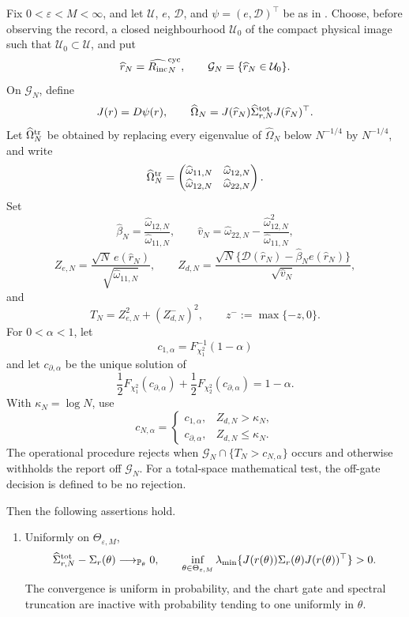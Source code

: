 \begin{theorem}
\label{thm:uniform-joint-physical-image-test-main}
Fix \(0<\varepsilon<M<\infty\), and let \(\mathcal U\), \(e\),
\(\mathcal D\), and \(\psi=(e,\mathcal D)^\top\) be as in
.  Choose, before observing the
record, a closed neighbourhood \(\mathcal U_0\) of the compact physical
image such that \(\mathcal U_0\subset\mathcal U\), and put
\[
\widehat r_N=\widehat{R_{\mathrm{inc}}}_N^{\rm cyc},
\qquad
\mathcal G_N=\{\widehat r_N\in\mathcal U_0\}.
\]
On \(\mathcal G_N\), define
\[
J(r)=D\psi(r),\qquad
\widehat\Omega_N
=J(\widehat r_N)\widehat\Sigma_{r,N}^{\rm tot}
J(\widehat r_N)^\top .
\]
Let \(\widehat\Omega_N^{\rm tr}\) be obtained by replacing every eigenvalue
of \(\widehat\Omega_N\) below \(N^{-1/4}\) by \(N^{-1/4}\), and write
\[
\widehat\Omega_N^{\rm tr}
=\begin{pmatrix}
\widehat\omega_{11,N}&\widehat\omega_{12,N}\\
\widehat\omega_{12,N}&\widehat\omega_{22,N}
\end{pmatrix}.
\]
Set
\[
\widehat\beta_N
=\frac{\widehat\omega_{12,N}}{\widehat\omega_{11,N}},
\qquad
\widehat v_N
=\widehat\omega_{22,N}
-\frac{\widehat\omega_{12,N}^2}{\widehat\omega_{11,N}},
\]
\[
Z_{e,N}
=\frac{\sqrt N\,e(\widehat r_N)}
{\sqrt{\widehat\omega_{11,N}}},
\qquad
Z_{d,N}
=\frac{\sqrt N\{\mathcal D(\widehat r_N)
-\widehat\beta_Ne(\widehat r_N)\}}
{\sqrt{\widehat v_N}},
\]
and
\[
T_N=Z_{e,N}^2+(Z_{d,N}^{-})^2,
\qquad z^-:=\max\{-z,0\}.
\]
For \(0<\alpha<1\), let
\[
c_{1,\alpha}=F_{\chi_1^2}^{-1}(1-\alpha)
\]
and let \(c_{\partial,\alpha}\) be the unique solution of
\[
\frac12F_{\chi_1^2}(c_{\partial,\alpha})
+\frac12F_{\chi_2^2}(c_{\partial,\alpha})=1-\alpha.
\]
With \(\kappa_N=\log N\), use
\[
c_{N,\alpha}=
\begin{cases}
c_{1,\alpha},&Z_{d,N}>\kappa_N,\\
c_{\partial,\alpha},&Z_{d,N}\le\kappa_N.
\end{cases}
\]
The operational procedure rejects when
\(\mathcal G_N\cap\{T_N>c_{N,\alpha}\}\) occurs and otherwise withholds
the report off \(\mathcal G_N\).  For a total-space mathematical test, the
off-gate decision is defined to be no rejection.

Then the following assertions hold.
\begin{enumerate}[label=\textup{(\roman*)}]
\item Uniformly on \(\Theta_{\varepsilon,M}\),
\[
\widehat\Sigma_{r,N}^{\rm tot}-\Sigma_r(\theta)
\longrightarrow_{\mathbb{P}_\theta}0,
\qquad
\inf_{\theta\in\Theta_{\varepsilon,M}}
\lambda_{\min}\{J(r(\theta))\Sigma_r(\theta)J(r(\theta))^\top\}>0.
\]
The convergence is uniform in probability, and the chart gate and spectral
truncation are inactive with probability tending to one uniformly in
\(\theta\).


\end{enumerate}
\end{theorem}
